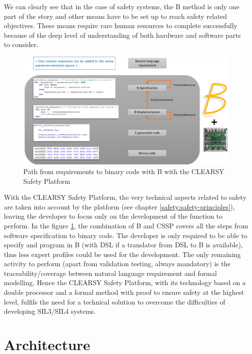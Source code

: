 We can clearly see that in the case of safety systems, the B method is only one part of the story and other means have to be set up to reach safety related objectives. These means require rare human resources to complete successfully because of the deep level of understanding of both hardware and software parts to consider. \\

\begin{figure}[h]
\centering\includegraphics[scale=0.3]{Pictures/chapterSafetyPrinciples/SAFETY-BCSSPcycle.png}
\caption{Path from requirements to binary code with B with the CLEARSY Safety Platform}
\label{safety:CSSP}
\end{figure}

With the CLEARSY Safety Platform, the very technical aspects related to safety are taken into account by the platform (see chapter \ref{safety:safety-principles}), leaving the developer to focus only on the development of the function to perform. In the figure \ref{safety:CSSP}, the combination of B and CSSP covers all the steps from software specification to binary code. The developer is only required to be able to specify and program in B (with DSL if a translator from DSL to B is available), thus less expert profiles could be used for the development. The only remaining activity to perform (apart from validation testing, always mandatory) is the traceability/coverage between natural language requirement and formal modelling. Hence the CLEARSY Safety Platform, with its technology based on a double processor and a formal method with proof to ensure safety at the highest level, fulfils the need for a technical solution to overcome the difficulties of developing SIL3/SIL4 systems.

\section{Architecture}

